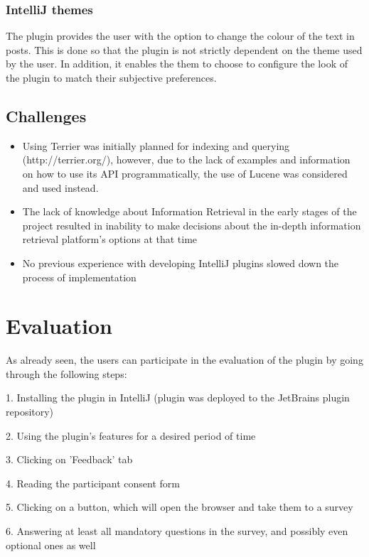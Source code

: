 \documentclass{l4proj}
\begin{document}
\subsection{IntelliJ themes}
The plugin provides the user with the option to change the colour of the text in posts. This is done so that the plugin is not strictly dependent on the theme used by the user. In addition, it enables the them to choose to configure the look of the plugin to match their subjective preferences.


\section{Challenges}
\begin{itemize}
\item Using Terrier was initially planned for indexing and querying (http://terrier.org/), however, due to the lack of examples and information on how to use its API programmatically, the use of Lucene was considered and used instead.

\item The lack of knowledge about Information Retrieval in the early stages of the project resulted in inability to make decisions about the in-depth information retrieval platform's options at that time

\item No previous experience with developing IntelliJ plugins slowed down the process of implementation

\end{itemize}

\chapter{Evaluation}
As already seen, the users can participate in the evaluation of the plugin by going through the following steps:

1. Installing the plugin in IntelliJ (plugin was deployed to the JetBrains plugin repository)

2. Using the plugin's features for a desired period of time

3. Clicking on 'Feedback' tab

4. Reading the participant consent form

5. Clicking on a button, which will open the browser and take them to a survey

6. Answering at least all mandatory questions in the survey, and possibly even optional ones as well
\end{document}
